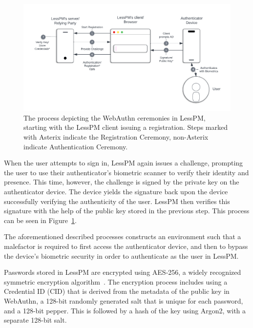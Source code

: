 \begin{figure}[htbp]
  \begin{center}
    \includegraphics[scale=0.49]{images/webauthn}
    \caption{The process depicting the WebAuthn ceremonies in LessPM,
      starting with the LessPM client issuing a registration. Steps marked
      with Asterix indicate the Registration Ceremony, non-Asterix indicate
      Authentication Ceremony. }
    \label{fig:webauthn}
  \end{center}
\end{figure}

When the user attempts to sign in, LessPM again issues a challenge,
prompting the user to use their authenticator's biometric scanner to verify
their identity and presence.
This time, however, the challenge is signed by the private key on the
authenticator device.
The device yields the signature back upon the device successfully verifying the
authenticity of the user.
LessPM then verifies this signature with the help of the public key
stored in the previous step.
This process can be seen in Figure~\ref{fig:webauthn}.

The aforementioned described processes constructs an environment such that a
malefactor is required to first access the authenticator device, and then
to bypass the device's biometric security in order to authenticate as the user
in LessPM\@.

Passwords stored in LessPM are encrypted using AES-256, a widely recognized
symmetric encryption
algorithm~\cite{schneier2000secrets,rijndael_book,nistfips197256}.
The encryption process includes using a Credential ID (CID) that is derived from
the metadata of the public key in WebAuthn, a 128-bit randomly generated salt
that is unique for each password, and a 128-bit pepper.
This is followed by a hash of the key using Argon2, with a separate 128-bit
salt.

